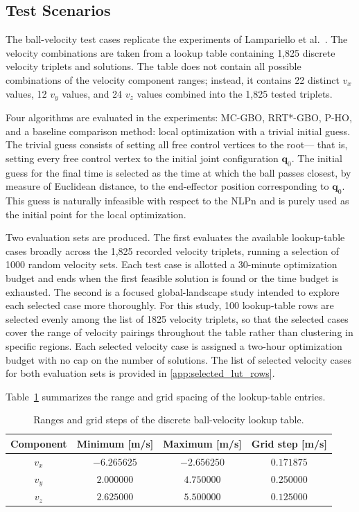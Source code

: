 \subsection{Test Scenarios}
The ball-velocity test cases replicate the experiments of Lampariello et al.~\cite{Lampariello11}. 
The velocity combinations are taken from a lookup table containing 1,825 discrete 
velocity triplets and solutions. The table does not contain all possible combinations 
of the velocity component ranges; instead, it contains 22 distinct $v_x$ values, 
12 $v_y$ values, and 24 $v_z$ values combined into the 1,825 tested triplets.

Four algorithms are evaluated in the experiments: \ac{MC-GBO}, \ac{RRT*-GBO}, \ac{P-HO}, 
and a baseline comparison method: local optimization with a trivial initial guess. 
The trivial guess consists of setting all free control vertices to the root---
that is, setting every free control vertex to the initial joint
configuration $\mathbf{q}_0$. The initial guess for the final time is selected
as the time at which the ball passes closest, by measure of Euclidean distance, to the
end-effector position corresponding to $\mathbf{q}_0$.
This guess is naturally infeasible with respect to the \ac{NLPn} and is purely used
as the initial point for the local optimization.

Two evaluation sets are produced. The first evaluates the available
lookup-table cases broadly across the 1,825 recorded velocity triplets,
running a selection of 1000 random velocity sets. Each test case is allotted
a 30-minute optimization budget and ends when the first feasible solution is found
or the time budget is exhausted.
The second is a focused global-landscape study intended to explore each selected
case more thoroughly. For this study, 100 lookup-table rows are
selected evenly among the list of 1825 velocity triplets, 
so that the selected cases cover the range of velocity pairings throughout the
table rather than clustering in specific regions. Each selected velocity case is
assigned a two-hour optimization budget with no cap on the number of solutions.
The list of selected velocity cases for both evaluation sets is provided in \cref{app:selected_lut_rows}.

Table~\ref{tab:ball_velocity_lookup} summarizes the range and grid spacing of the lookup-table entries. 

\begin{table}[htbp]
\centering
\caption{Ranges and grid steps of the discrete ball-velocity lookup table.}
\label{tab:ball_velocity_lookup}
\begin{tabular}{c c c c}
\toprule
\textbf{Component} & \textbf{Minimum [m/s]} & \textbf{Maximum [m/s]} & \textbf{Grid step [m/s]} \\
\midrule
$v_x$ & $-6.265625$ & $-2.656250$ & $0.171875$ \\
$v_y$ & $2.000000$ & $4.750000$ & $0.250000$ \\
$v_z$ & $2.625000$ & $5.500000$ & $0.125000$ \\
\bottomrule
\end{tabular}
\end{table}

